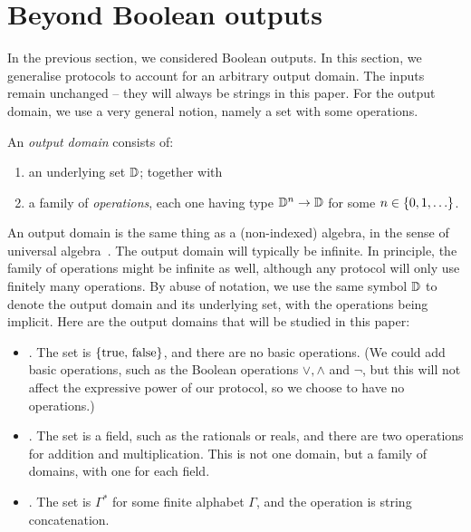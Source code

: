 \section{Beyond Boolean outputs}
\label{sec:beyond-boolean-outputs}

In the previous section, we considered Boolean outputs. In this section, we generalise protocols to account for an arbitrary output domain. The inputs remain unchanged -- they will always be strings in this paper.  For the output domain, we use a very general notion, namely a set with some operations. 
\begin{definition}
    An \emph{output domain} consists of: 
    \begin{enumerate}
        \item an underlying set $\mathbb D$; together with
        \item a family of \emph{operations}, each one having  type $\mathbb D^n \to \mathbb D$ for some $n \in \{0,1,\ldots\}$.
    \end{enumerate}
\end{definition}
An output domain is the same thing as a (non-indexed) algebra, in the sense of universal algebra~\cite[p.5]{hobby1988structure}. 
The output domain will typically  be infinite. In principle, the family of operations might be infinite as well,
although any protocol will only use finitely many operations.
By abuse of notation, we use the same symbol $\mathbb D$ to denote the output domain and its underlying set, with the operations being implicit. Here are the output domains that will be studied in this paper: 
\begin{itemize}
    \item {}. The set is $\{\text{true, false}\}$, and there are no basic operations. (We could add basic operations, such as the Boolean operations $\lor,\land$ and $\neg$, but this will not affect the expressive power of our protocol, so we choose to have no operations.)
    \item {}. The set is a field, such as the rationals or reals, and there are two operations for addition and multiplication. This is not one domain, but a family of domains, with one for each field.
    \item {}. The set is $\Gamma^*$ for some finite alphabet $\Gamma$, and the operation is string concatenation.
\end{itemize}

